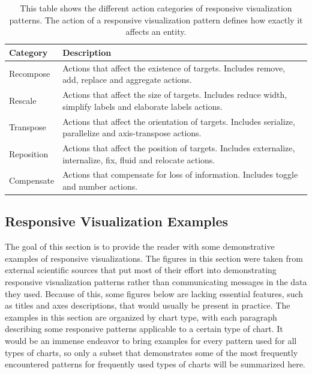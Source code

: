 \begin{table}[tp]
    \centering
    \begin{tabularx}{\linewidth}{| l | X |}
        \hline
        \textbf{Category} & \textbf{Description} \\ \hline
        Recompose & Actions that affect the existence of targets. Includes remove, add, replace and aggregate actions. \\
        \hline
        Rescale & Actions that affect the size of targets. Includes reduce width, simplify labels and elaborate labels actions. \\
        \hline
        Transpose & Actions that affect the orientation of targets. Includes serialize, parallelize and axis-transpose actions. \\
        \hline
        Reposition & Actions that affect the position of targets. Includes externalize, internalize, fix, fluid and relocate actions. \\
        \hline
        Compensate & Actions that compensate for loss of information. Includes toggle and number actions. \\
        \hline
    \end{tabularx}
    \caption[Actions of Responsive Visualization Patterns]
    {
        This table shows the different action categories of responsive visualization patterns. The action of a responsive visualization pattern defines how exactly it affects an entity.
    }
    \label{tab:PatternsActions}
\end{table}

\subsection{Responsive Visualization Examples}

The goal of this section is to provide the reader with some demonstrative examples of responsive visualizations. The figures in this section were taken from external scientific sources that put most of their effort into demonstrating responsive visualization patterns rather than communicating messages in the data they used. Because of this, some figures below are lacking essential features, such as titles and axes descriptions, that would usually be present in practice. The examples in this section are organized by chart type, with each paragraph describing some responsive patterns applicable to a certain type of chart. It would be an immense endeavor to bring examples for every pattern used for all types of charts, so only a subset that demonstrates some of the most frequently encountered patterns for frequently used types of charts will be summarized here.

